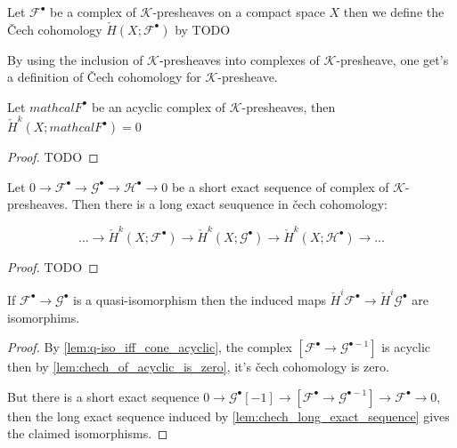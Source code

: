 \begin{definition}\label{def:chech_of_compelx_of_k_prsh}
    Let $\mathcal{F}^{\bullet}$ be a complex of $\mathcal{K}$-presheaves on a compact space $X$ then we define the \v{C}ech cohomology $\check{H}(X;\mathcal{F}^{\bullet})$ by TODO
\end{definition}

\begin{remark}\label{def:chech_of_k_prsh}
    By using the inclusion of $\mathcal{K}$-presheaves into complexes of $\mathcal{K}$-presheave, one get's a definition of \v{C}ech cohomology for $\mathcal{K}$-presheave.
\end{remark}

\begin{lemma}\label{lem:chech_of_acyclic_is_zero}
    Let $mathcal{F}^{\bullet}$ be an acyclic complex of $\mathcal{K}$-presheaves, then $\check{H}^k(X;mathcal{F}^{\bullet})=0$

\end{lemma}

\begin{proof}
    TODO
\end{proof}

\begin{lemma}\label{lem:chech_long_exact_sequence}
    Let $0\to \mathcal{F}^{\bullet}\to \mathcal{G}^{\bullet}\to \mathcal{H}^{\bullet}\to 0$ be a short exact sequence of complex of $\mathcal{K}$-presheaves. Then there is a long exact seuquence in \v{c}ech cohomology: 

    \[\ldots\to \check{H}^k(X;\mathcal{F}^{\bullet})\to \check{H}^k(X;\mathcal{G}^{\bullet})\to \check{H}^k(X;\mathcal{H}^{\bullet})\to \ldots\]

\end{lemma}

\begin{proof}
    TODO
\end{proof}

\begin{lemma}\label{lem:chech_preserve_quasi_iso}
    If $\mathcal{F}^{\bullet}\to\mathcal{G}^{\bullet}$ is a quasi-isomorphism then the induced maps $\check{H}^i\mathcal{F}^{\bullet}\to \check{H}^i\mathcal{G}^{\bullet}$ are isomorphims.
\end{lemma}

\begin{proof}
    By \ref{lem:q-iso_iff_cone_acyclic}, the complex $[\mathcal{F}^{\bullet}\to \mathcal{G}^{\bullet-1}]$ is acyclic then by \ref{lem:chech_of_acyclic_is_zero}, it's \v{c}ech cohomology is zero.

    But there is a short exact sequence $0\to \mathcal{G}^{\bullet}[-1]\to [\mathcal{F}^{\bullet}\to \mathcal{G}^{\bullet-1}]\to \mathcal{F}^{\bullet} \to 0$, then the long exact sequence induced by \ref{lem:chech_long_exact_sequence} gives the claimed isomorphisms.
\end{proof}

